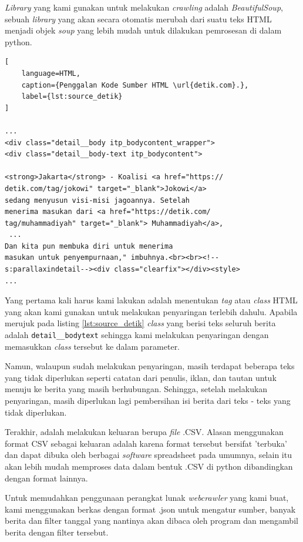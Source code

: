 \textit{Library} yang kami gunakan untuk melakukan \textit{crawling} adalah \textit{BeautifulSoup}, sebuah \textit{library} yang akan secara otomatis merubah dari suatu teks HTML menjadi objek \textit{soup} yang lebih mudah untuk dilakukan pemrosesan di dalam python.

\begin{lstlisting}[
    language=HTML, 
    caption={Penggalan Kode Sumber HTML \url{detik.com}.},
    label={lst:source_detik}
]

...
<div class="detail__body itp_bodycontent_wrapper">
<div class="detail__body-text itp_bodycontent">

<strong>Jakarta</strong> - Koalisi <a href="https://
detik.com/tag/jokowi" target="_blank">Jokowi</a> 
sedang menyusun visi-misi jagoannya. Setelah 
menerima masukan dari <a href="https://detik.com/
tag/muhammadiyah" target="_blank"> Muhammadiyah</a>,
 ... 
Dan kita pun membuka diri untuk menerima 
masukan untuk penyempurnaan," imbuhnya.<br><br><!--
s:parallaxindetail--><div class="clearfix"></div><style>
...

\end{lstlisting}

Yang pertama kali harus kami lakukan adalah menentukan \textit{tag} atau \textit{class} HTML yang akan kami gunakan untuk melakukan penyaringan terlebih dahulu. Apabila merujuk pada listing \ref{lst:source_detik} \textit{class} yang berisi teks seluruh berita adalah \texttt{detail\_\_body\-text} sehingga kami melakukan penyaringan dengan memasukkan \textit{class} tersebut ke dalam parameter.

Namun, walaupun sudah melakukan penyaringan, masih terdapat beberapa teks yang tidak diperlukan seperti catatan dari penulis, iklan, dan tautan untuk menuju ke berita yang masih berhubungan. Sehingga, setelah melakukan penyaringan, masih diperlukan lagi pembersihan isi berita dari teks - teks yang tidak diperlukan.

Terakhir, adalah melakukan keluaran berupa \textit{file} .CSV. Alasan menggunakan format CSV sebagai keluaran adalah karena format tersebut bersifat 'terbuka' dan dapat dibuka oleh berbagai \textit{software} spreadsheet pada umumnya, selain itu akan lebih mudah memproses data dalam bentuk .CSV di python dibandingkan dengan format lainnya.

Untuk memudahkan penggunaan perangkat lunak \textit{webcrawler} yang kami buat, kami menggunakan berkas dengan format .json untuk mengatur sumber, banyak berita dan filter tanggal yang nantinya akan dibaca oleh program dan mengambil berita dengan filter tersebut.

